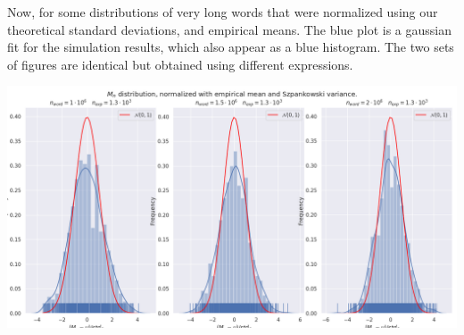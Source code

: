 

\pagebreak
Now, for some distributions of very long words that were normalized using 
our theoretical standard deviations, and empirical means. The blue plot is 
a gaussian fit for the simulation results, which also appear as a blue histogram.
The two sets of figures are identical but obtained using different expressions.

\noindent
 	 \begin{minipage}{\textwidth}
        \includegraphics[width = \textwidth,
        				    trim = 0 0.5cm 0 0,
        				    	clip=true]{./figs/eig_fig2.png}	
	\end{minipage} 

